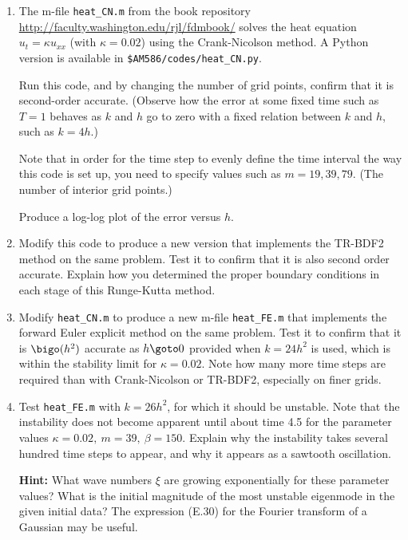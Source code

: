 \documentclass[10pt]{article}
\begin{document}
\begin{enumerate} 
\item The m-file \verb+heat_CN.m+ from the book repository
\url{http://faculty.washington.edu/rjl/fdmbook/} 
solves the heat equation $u_t = \kappa u_{xx}$  (with $\kappa = 0.02$)
using the Crank-Nicolson method.
A Python version is available in \verb+$AM586/codes/heat_CN.py+.

Run this code, and by changing the number of grid points, confirm that it is
second-order accurate.  (Observe how the error at some fixed time such as $T=1$
behaves as $k$ and $h$ go to zero with a fixed relation between $k$ and $h$,
such as $k = 4h$.)

Note that in order for the time step to evenly define the time interval the
way this code is set up, you need to specify values such as $m=19, 39, 79$.
(The number of interior grid points.)

Produce a log-log plot of the error versus $h$.

\item Modify this code to produce a new version that
implements the TR-BDF2 method on the same problem.  Test it to confirm that
it is also second order accurate.  Explain how you determined the proper
boundary conditions in each stage of this Runge-Kutta method.

\item Modify \verb+heat_CN.m+ to produce a new m-file \verb+heat_FE.m+ that
implements the forward Euler explicit 
method on the same problem.  Test it to confirm that
it is $\bigo(h^2)$ accurate as $h\goto 0$ provided when $k = 24 h^2$ is
used, which is within the stability limit for $\kappa = 0.02$.  Note how
many more time steps are required than with Crank-Nicolson or TR-BDF2,
especially on finer grids.

\item Test \verb+heat_FE.m+ with $k = 26 h^2$, for which it should be
unstable.  Note that the instability does not become apparent until about
time 4.5 for the parameter values $\kappa = 0.02,~ m=39,~\beta = 150$.
Explain why the instability takes several hundred time steps to appear, and
why it appears as a sawtooth oscillation. 

{\bf Hint:} What wave numbers $\xi$ are growing exponentially for these
parameter values?  What is the initial magnitude of the most unstable
eigenmode in the given initial data?  The expression (E.30) for the Fourier
transform of a Gaussian may be useful.

\end{enumerate}
\end{document}

